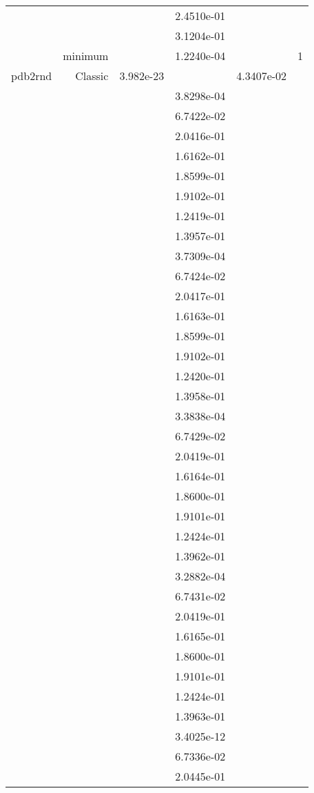 \begin{xltabular}{\textwidth}{r|rS[table-format=1.3e+2]S[table-format=1.4e+2]S[table-format=1.4e+2]S[table-format=-1.5]}
&  &  & 2.4510e-01 & & \\
&  &  & 3.1204e-01 & & \\
& minimum &  & 1.2240e-04 & & 1 \\  \addlinespace
pdb2rnd & Classic & 3.982e-23 &  & 4.3407e-02 & \\
&  &  & 3.8298e-04 & & \\
&  &  & 6.7422e-02 & & \\
&  &  & 2.0416e-01 & & \\
&  &  & 1.6162e-01 & & \\
&  &  & 1.8599e-01 & & \\
&  &  & 1.9102e-01 & & \\
&  &  & 1.2419e-01 & & \\
&  &  & 1.3957e-01 & & \\
&  &  & 3.7309e-04 & & \\
&  &  & 6.7424e-02 & & \\
&  &  & 2.0417e-01 & & \\
&  &  & 1.6163e-01 & & \\
&  &  & 1.8599e-01 & & \\
&  &  & 1.9102e-01 & & \\
&  &  & 1.2420e-01 & & \\
&  &  & 1.3958e-01 & & \\
&  &  & 3.3838e-04 & & \\
&  &  & 6.7429e-02 & & \\
&  &  & 2.0419e-01 & & \\
&  &  & 1.6164e-01 & & \\
&  &  & 1.8600e-01 & & \\
&  &  & 1.9101e-01 & & \\
&  &  & 1.2424e-01 & & \\
&  &  & 1.3962e-01 & & \\
&  &  & 3.2882e-04 & & \\
&  &  & 6.7431e-02 & & \\
&  &  & 2.0419e-01 & & \\
&  &  & 1.6165e-01 & & \\
&  &  & 1.8600e-01 & & \\
&  &  & 1.9101e-01 & & \\
&  &  & 1.2424e-01 & & \\
&  &  & 1.3963e-01 & & \\
&  &  & 3.4025e-12 & & \\
&  &  & 6.7336e-02 & & \\
&  &  & 2.0445e-01 & & \\

\end{xltabular}
